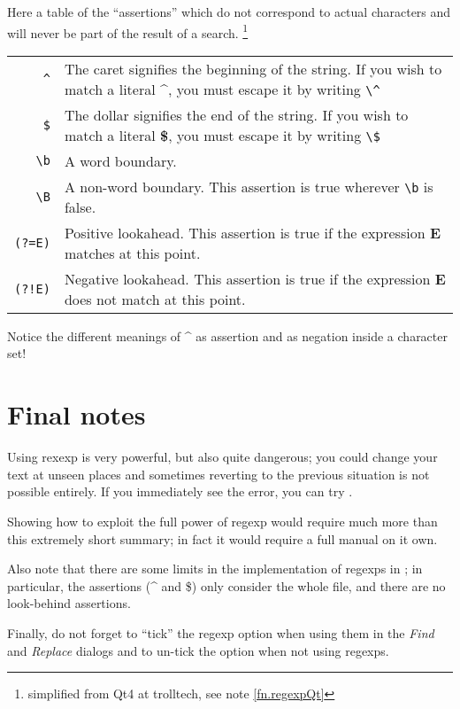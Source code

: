 Here a table of the ``assertions'' which do not correspond to actual characters and will never be part of the result of a search. \footnote{simplified from Qt4 at trolltech, see note \ref{fn.regexpQt}}
\smallskip

\noindent\begin{tabular}{Rp{113mm}}
\toprule
\verb|^| & The caret signifies the beginning of the string. If you wish to match a literal \textbf{\^{}}, you must escape it by writing \verb|\^|\\
\verb|$| & The dollar signifies the end of the string. If you wish to match a literal \textbf{\$}, you must escape it by writing \verb|\$|\\  
\verb|\b| & A word boundary.\\
\verb|\B| & A non-word boundary. This assertion is true wherever \verb|\b| is false.\\
\verb|(?=E)| & Positive lookahead. This assertion is true if the expression \textbf{E} matches at this point.\\
\verb|(?!E)| & Negative lookahead. This assertion is true if the expression \textbf{E} does not match at this point.\\
\bottomrule
\end{tabular}
\smallskip

Notice the different meanings of \textbf{\^{}} as assertion and as negation inside a character set!

\section{Final notes}

Using rexexp is very powerful, but also quite dangerous; you could change your text at unseen places and sometimes reverting to the previous situation is not possible entirely. If you immediately see the error, you can try \mbox{}.

Showing how to exploit the full power of regexp would require much more than this extremely short summary; in fact it would require a full manual on it own.

Also note that there are some limits in the implementation of regexps in {\Tw}; in particular, the assertions (\^{} and \$) only consider the whole file, and there are no look-behind assertions.

Finally, do not forget to ``tick'' the regexp option when using them in the \emph{Find} and \emph{Replace} dialogs and to un-tick the option when not using regexps.

